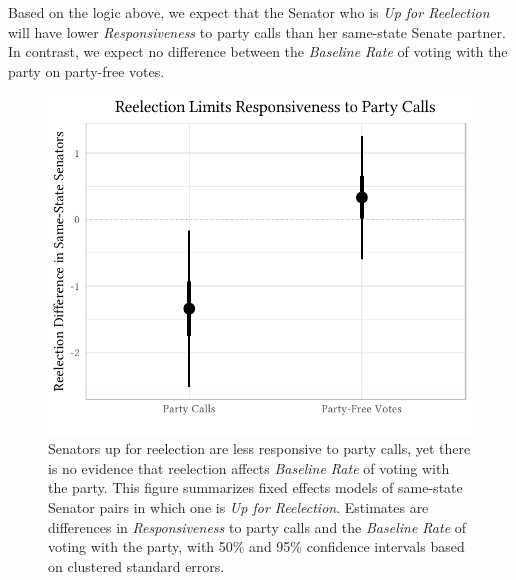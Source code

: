 \documentclass[12pt]{article}
\begin{document}
Based on the logic above, we expect that the Senator who is
\textit{Up for Reelection} will have lower \textit{Responsiveness} to party
calls than her same-state Senate partner.
In contrast, we expect no difference between the \textit{Baseline Rate} of
voting with the party on party-free votes.

\begin{figure}[t]
\centering
\includegraphics[width = 12cm]{senate_difference_estimates.pdf}
\caption{
  Senators up for reelection are less responsive to party calls, yet there is
  no evidence that reelection affects \textit{Baseline Rate} of voting with the
  party.
  This figure summarizes fixed effects models of same-state Senator pairs in
  which one is \textit{Up for Reelection}.
  Estimates are differences in \textit{Responsiveness} to party calls and the
  \textit{Baseline Rate} of voting with the party, with 50\% and 95\%
  confidence intervals based on clustered standard errors.
\label{fig-reelection-responsiveness}}
\end{figure}
\end{document}
